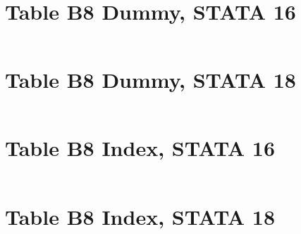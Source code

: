 \documentclass{article}
\begin{document}
\section*{Table B8 Dummy, STATA 16}

\begin{tabular}{ l c c c c c}
    
\end{tabular}

\section*{Table B8 Dummy, STATA 18}

\begin{tabular}{ l c c c c c}
    
\end{tabular}

\section*{Table B8 Index, STATA 16}

\begin{tabular}{ l c c c c c}
    
\end{tabular}

\section*{Table B8 Index, STATA 18}

\begin{tabular}{ l c c c c c}
    
\end{tabular}
    
\end{document}
